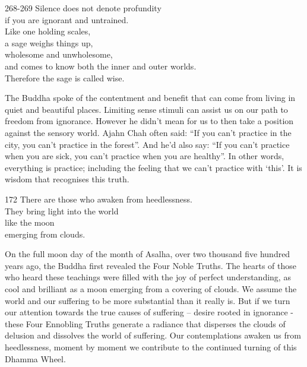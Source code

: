 
\begin{dhpVerse}{268-269}
\label{dhp-268}\label{dhp-269}
Silence does not denote profundity\\
if you are ignorant and untrained.\\
Like one holding scales,\\
a sage weighs things up,\\
wholesome and unwholesome,\\
and comes to know both the inner and outer worlds.\\
Therefore the sage is called wise.
\end{dhpVerse}

\begin{dhpRefl}

The Buddha spoke of the contentment and benefit that can come from
living in quiet and beautiful places. Limiting sense stimuli can
assist us on our path to freedom from ignorance. However he didn't
mean for us to then take a position against the sensory world. Ajahn
Chah often said: ``If you can't practice in the city, you can't
practice in the forest''. And he'd also say: ``If you can't practice
when you are sick, you can't practice when you are healthy''. In
other words, everything is practice; including the feeling that we
can't practice with `this'. It is wisdom that recognises this truth.

\end{dhpRefl}


\begin{dhpVerse}{172}
\label{dhp-172}
There are those who awaken from heedlessness.\\
They bring light into the world\\
like the moon\\
emerging from clouds.
\end{dhpVerse}

\begin{dhpRefl}

On the full moon day of the month of Asalha, over two thousand five
hundred years ago, the Buddha first revealed the Four Noble Truths.
The hearts of those who heard these teachings were filled with the
joy of perfect understanding, as cool and brilliant as a moon
emerging from a covering of clouds. We assume the world and our
suffering to be more substantial than it really is. But if we turn
our attention towards the true causes of suffering -- desire rooted
in ignorance - these Four Ennobling Truths generate a radiance that
disperses the clouds of delusion and dissolves the world of
suffering. Our contemplations awaken us from heedlessness, moment by
moment we contribute to the continued turning of this Dhamma Wheel.

\end{dhpRefl}

